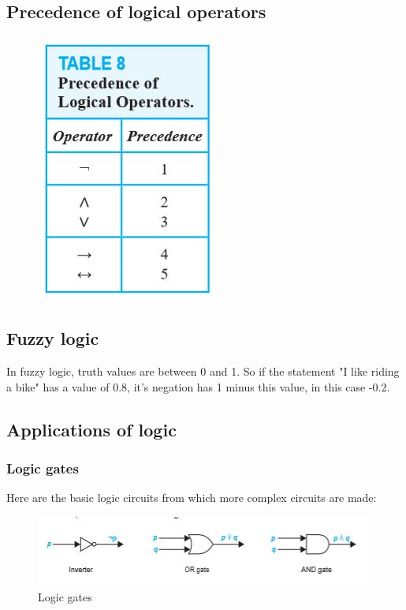 \documentclass[titlepage]{article}
\theoremstyle{definition}
\numberwithin{equation}{subsection}
\numberwithin{remark}{subsection}
\begin{document}
\subsection{Precedence of logical operators}

\begin{figure}[h]
    \centering
    \includegraphics{figures/precedence}
\end{figure}

\subsection{Fuzzy logic}

In fuzzy logic, truth values are between 0 and 1. So if the statement "I like riding a bike" has a value of 0.8, it's negation has 1 minus this value, in this case -0.2. 

\subsection{Applications of logic}
\subsubsection{Logic gates}
Here are the basic logic circuits from which more complex circuits are made: 

\begin{figure}[h]
    \centering
    \includegraphics[scale= 1]{epflLectureNotes/advancedComputation/figures/logicgates.JPG}
    \caption{Logic gates}
    \label{fig:my_label}
\end{figure}
\end{document}
